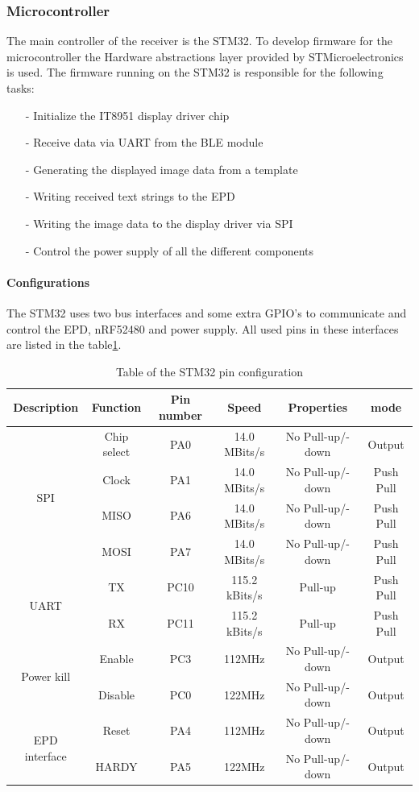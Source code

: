 \subsubsection{Microcontroller}
The main controller of the receiver is the STM32. To develop firmware for the microcontroller the Hardware abstractions layer provided by STMicroelectronics is used. The firmware running on the STM32 is responsible for the following tasks:
\begin{itemize}[H]
	\item[-] Initialize the IT8951 display driver chip
	\item[-] Receive data via UART from the BLE module
	\item[-] Generating the displayed image data from a template
	\item[-] Writing received text strings to the EPD
	\item[-] Writing the image data to the display driver via SPI
	\item[-] Control the power supply of all the different components
\end{itemize}

\paragraph{Configurations}
The STM32 uses two bus interfaces and some extra GPIO's to communicate and control the EPD, nRF52480 and power supply. All used pins in these interfaces are listed in the table\ref{table:stm32}.  

\begin{table}[!ht]
	\begin{tabular}{ |c|c|c|c|c|c| } 
		\hline
	Description & Function &Pin number & Speed& Properties& mode \\
		\hline
	\multirow{4}{4em}{SPI} 	& Chip select & PA0&14.0 MBits/s &No Pull-up/-down& Output \\ 
								& Clock& PA1 & 14.0 MBits/s&No Pull-up/-down& Push Pull \\ 
								& MISO & PA6&14.0 MBits/s & No Pull-up/-down& Push Pull  \\ 
								& MOSI & PA7& 14.0 MBits/s&No Pull-up/-down& Push Pull  \\ 
		\hline
	\multirow{2}{4em}{UART} & TX & PC10 & 115.2 kBits/s & Pull-up& Push Pull   \\ 
								& RX & PC11 & 115.2 kBits/s & Pull-up& Push Pull \\ 
	\hline
	
	\multirow{2}{4em}{Power kill} & Enable & PC3 & 112MHz &No Pull-up/-down& Output   \\ 
										  & Disable& PC0 & 122MHz &No Pull-up/-down& Output \\ 
	\hline
	
	\multirow{2}{4em}{EPD interface} & Reset & PA4 & 112MHz &No Pull-up/-down& Output   \\ 
									& HARDY& PA5 & 122MHz &No Pull-up/-down& Output \\ 
	\hline

	\end{tabular}
	\caption{Table of the STM32 pin configuration\label{table:stm32}}
\end{table}

